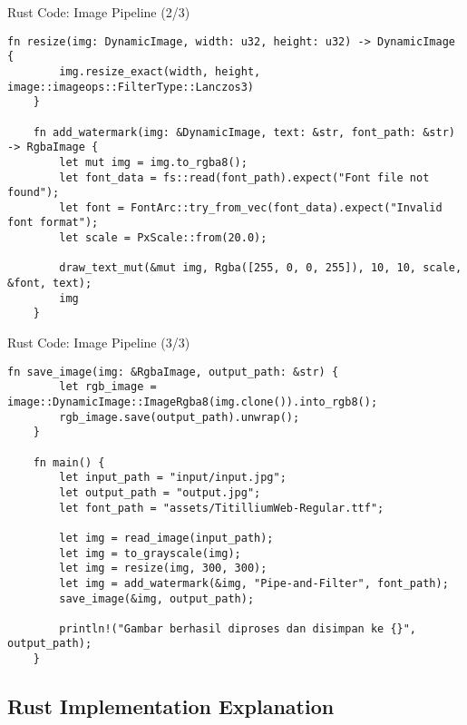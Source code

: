 \documentclass[aspectratio=169, table]{beamer}
\begin{document}
\begin{frame}[fragile]{Rust Code: Image Pipeline (2/3)}
\vspace{10pt}
\begin{lstlisting}[style=RustStyle]
	fn resize(img: DynamicImage, width: u32, height: u32) -> DynamicImage {
		img.resize_exact(width, height, image::imageops::FilterType::Lanczos3)
	}
	
	fn add_watermark(img: &DynamicImage, text: &str, font_path: &str) -> RgbaImage {
		let mut img = img.to_rgba8();
		let font_data = fs::read(font_path).expect("Font file not found");
		let font = FontArc::try_from_vec(font_data).expect("Invalid font format");
		let scale = PxScale::from(20.0);
		
		draw_text_mut(&mut img, Rgba([255, 0, 0, 255]), 10, 10, scale, &font, text);
		img
	}
\end{lstlisting}
\end{frame}

\begin{frame}[fragile]{Rust Code: Image Pipeline (3/3)}
\vspace{10pt}
\begin{lstlisting}[style=RustStyle]
	fn save_image(img: &RgbaImage, output_path: &str) {
		let rgb_image = image::DynamicImage::ImageRgba8(img.clone()).into_rgb8();
		rgb_image.save(output_path).unwrap();
	}
	
	fn main() {
		let input_path = "input/input.jpg";
		let output_path = "output.jpg";
		let font_path = "assets/TitilliumWeb-Regular.ttf";
		
		let img = read_image(input_path);
		let img = to_grayscale(img);
		let img = resize(img, 300, 300);
		let img = add_watermark(&img, "Pipe-and-Filter", font_path);
		save_image(&img, output_path);
		
		println!("Gambar berhasil diproses dan disimpan ke {}", output_path);
	}
\end{lstlisting}
\end{frame}



\subsection{Rust Implementation Explanation}
\end{document}
